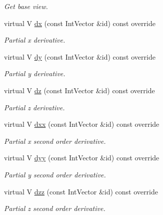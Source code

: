 \begin{DoxyCompactItemize}
\begin{DoxyCompactList}\small\item\em Get base view. \end{DoxyCompactList}\item 
virtual V \hyperlink{classUintah_1_1PhaseField_1_1detail_1_1bcs__basic__fd__view_3_01ScalarField_3_01T_01_4_00_01STN_07caa9955adf783da0505eac75e76f08_ad8f5b6be3ef5d9b502478f1978d8dd0e}{dx} (const Int\+Vector \&id) const override
\begin{DoxyCompactList}\small\item\em Partial x derivative. \end{DoxyCompactList}\item 
virtual V \hyperlink{classUintah_1_1PhaseField_1_1detail_1_1bcs__basic__fd__view_3_01ScalarField_3_01T_01_4_00_01STN_07caa9955adf783da0505eac75e76f08_acb8d3d8217637aecdac144650632c57f}{dy} (const Int\+Vector \&id) const override
\begin{DoxyCompactList}\small\item\em Partial y derivative. \end{DoxyCompactList}\item 
virtual V \hyperlink{classUintah_1_1PhaseField_1_1detail_1_1bcs__basic__fd__view_3_01ScalarField_3_01T_01_4_00_01STN_07caa9955adf783da0505eac75e76f08_abbfa68e1cf8c0eb675f3934f2fcf8259}{dz} (const Int\+Vector \&id) const override
\begin{DoxyCompactList}\small\item\em Partial z derivative. \end{DoxyCompactList}\item 
virtual V \hyperlink{classUintah_1_1PhaseField_1_1detail_1_1bcs__basic__fd__view_3_01ScalarField_3_01T_01_4_00_01STN_07caa9955adf783da0505eac75e76f08_ab5f1d6ae2f25c2d050775578499db79e}{dxx} (const Int\+Vector \&id) const override
\begin{DoxyCompactList}\small\item\em Partial x second order derivative. \end{DoxyCompactList}\item 
virtual V \hyperlink{classUintah_1_1PhaseField_1_1detail_1_1bcs__basic__fd__view_3_01ScalarField_3_01T_01_4_00_01STN_07caa9955adf783da0505eac75e76f08_af8155387a989a9a9c007b49cb4420f8e}{dyy} (const Int\+Vector \&id) const override
\begin{DoxyCompactList}\small\item\em Partial y second order derivative. \end{DoxyCompactList}\item 
virtual V \hyperlink{classUintah_1_1PhaseField_1_1detail_1_1bcs__basic__fd__view_3_01ScalarField_3_01T_01_4_00_01STN_07caa9955adf783da0505eac75e76f08_a8edd18a7f77bf23f10b87ad970da31c4}{dzz} (const Int\+Vector \&id) const override
\begin{DoxyCompactList}\small\item\em Partial z second order derivative. \end{DoxyCompactList}\end{DoxyCompactItemize}
